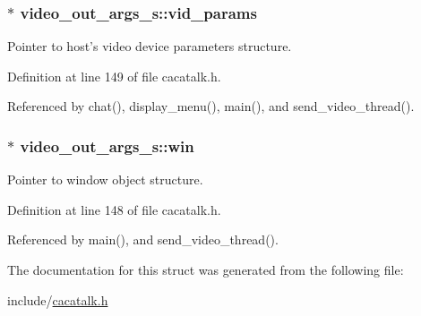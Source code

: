 \hypertarget{structvideo__out__args__s_a14fbf8a3ffd4d9534c61bff3fd6c6004}{
\subsubsection[{vid\-\_\-params}]{$\ast$ {\bf video\-\_\-out\-\_\-args\-\_\-s\-::vid\-\_\-params}}}\label{structvideo__out__args__s_a14fbf8a3ffd4d9534c61bff3fd6c6004}


\-Pointer to host's video device parameters structure. 



\-Definition at line 149 of file cacatalk.\-h.



\-Referenced by chat(), display\-\_\-menu(), main(), and send\-\_\-video\-\_\-thread().

\hypertarget{structvideo__out__args__s_a4c05a7d1e0e170c01b122e3419434b7c}{
\subsubsection[{win}]{$\ast$ {\bf video\-\_\-out\-\_\-args\-\_\-s\-::win}}}\label{structvideo__out__args__s_a4c05a7d1e0e170c01b122e3419434b7c}


\-Pointer to window object structure. 



\-Definition at line 148 of file cacatalk.\-h.



\-Referenced by main(), and send\-\_\-video\-\_\-thread().



\-The documentation for this struct was generated from the following file\-:\begin{DoxyCompactItemize}
\item 
include/\hyperlink{cacatalk_8h}{cacatalk.\-h}\end{DoxyCompactItemize}
